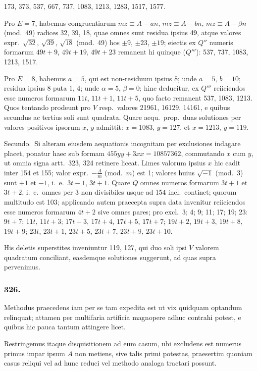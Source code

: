 \documentclass[12pt,a4paper]{article}
\theoremstyle{plain}
\theoremstyle{definition}
\theoremstyle{remark}
\begin{document}
173, 373, 537, 667, 737, 1083, 1213, 1283, 1517, 1577.

Pro $E=7$, habemus congruentiarum $mz\equiv A-an$, $mz\equiv A-bn$,
$mz\equiv A-\beta n$ (mod.\ 49) radices 32, 39, 18, quae omnes sunt residua
ipsius 49, atque valores expr.\ $\sqrt{32}$, $\sqrt{39}$, $\sqrt{18}$ (mod.\ 49) hos $\pm 9$, $\pm 23$,
$\pm 19$; eiectis ex $Q''$ numeris formarum $49t+9$, $49t+19$, $49t+23$
remanent hi quinque ($Q'''$): 537, 737, 1083, 1213, 1517.

Pro $E=8$, habemus $a=5$, qui est non-residuum ipsius 8; unde $a=5$,
$b=10$; residua ipsius 8 puta $1$, $4$; unde $\alpha=5$, $\beta=0$; hinc deducitur,
ex $Q'''$ reiiciendos esse numeros formarum $11t$, $11t+1$, $11t+5$, quo facto
remanent 537, 1083, 1213. Quos tentando prodeunt pro $V$ resp.\ valores
21961, 16129, 14161, e quibus secundus ac tertius soli sunt quadrata. Quare
aequ.\ prop.\ duas solutiones per valores positivos ipsorum $x$, $y$ admittit:
$x=1083$, $y=127$, et $x=1213$, $y=119$.

Secundo.\ Si alteram eiusdem aequationis incognitam per exclusiones
indagare placet, ponatur haec sub formam $455yy+3xx=10857362$,
commutando $x$ cum $y$, ut omnia signa artt.\ 323, 324 retinere liceat. Limes
valorum ipsius $x$ hic cadit inter 154 et 155; valor expr.\ $-\frac{A}{m}$ (mod.\ $m$)
est 1; valores huius $\sqrt{-1}$ (mod.\ 3) sunt $+1$ et $-1$, i.\ e.\ $3t-1$,
$3t+1$. Quare $Q$ omnes numeros formarum $3t+1$ et $3t+2$, i.\ e.\ omnes
per 3 non divisibiles usque ad 154 incl.\ continet; quorum multitudo est 103;
applicando autem praecepta supra data invenitur reiiciendos esse numeros
formarum $4t+2$ sive omnes pares; pro excl.\ 3; 4; 9; 11; 17; 19; 23:
$9t+7$; $11t$, $11t+3$; $17t+3$, $17t+4$, $17t+5$, $17t+7$; $19t+2$,
$19t+3$, $19t+8$, $19t+9$; $23t$, $23t+1$, $23t+5$, $23t+7$, $23t+9$,
$23t+10$.

His deletis superstites inveniuntur 119, 127, qui duo soli ipsi $V$ valorem
quadratum conciliant, easdemque solutiones suggerunt, ad quas supra
pervenimus.

\subsubsection*{326.}

Methodus praecedens iam per se tam expedita est ut vix quidquam
optandum relinquat; attamen per multifaria artificia magnopere adhuc
contrahi potest, e quibus hic pauca tantum attingere licet.

Restringemus itaque disquisitionem ad eum casum, ubi excludens est
numerus primus impar ipsum $A$ non metiens, sive talis primi potestas,
praesertim quoniam casus reliqui vel ad hunc reduci vel methodo analoga
tractari possunt.
\end{document}

